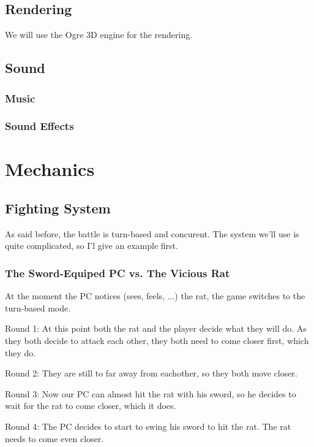 \documentclass[a4paper]{report}
\begin{document}
	\chapter{Rendering}

		We will use the Ogre 3D engine for the rendering.

	\chapter{Sound}

		\section{Music}

		\section{Sound Effects}

\part{Mechanics}

	\chapter{Fighting System}

		As said before, the battle is turn-based and concurent. The system  we'll use is quite complicated, so I'l give an example first.

		\section{The Sword-Equiped PC vs. The Vicious Rat}

			At the moment the PC notices (sees, feels, ...) the rat, the game switches to  the turn-based mode. 

			Round 1:
			At this point both the rat and the player decide what they will do. As they both decide to attack each other, they both need to come closer first, which they do.

			Round 2:
			They are still to far away from eachother, so they both move closer.

			Round 3:
			Now our PC can almost hit the rat with his sword, so he decides to wait for the rat to come closer, which it does.

			Round 4:
			The PC decides to start to swing his sword to hit the rat. The rat needs to come even closer.
\end{document}
